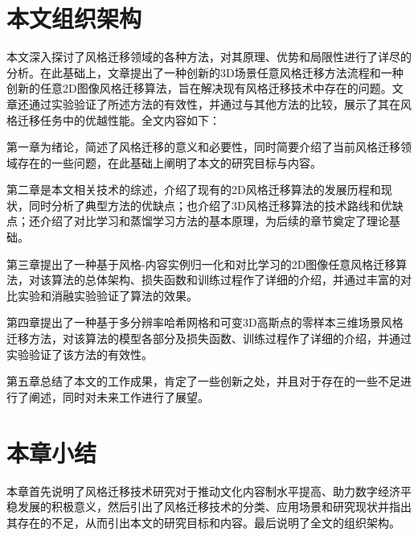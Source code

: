 \section{本文组织架构}
本文深入探讨了风格迁移领域的各种方法，对其原理、优势和局限性进行了详尽的分析。在此基础上，文章提出了一种创新的3D场景任意风格迁移方法流程和一种创新的任意2D图像风格迁移算法，旨在解决现有风格迁移技术中存在的问题。文章还通过实验验证了所述方法的有效性，并通过与其他方法的比较，展示了其在风格迁移任务中的优越性能。全文内容如下：
\par 第一章为绪论，简述了风格迁移的意义和必要性，同时简要介绍了当前风格迁移领域存在的一些问题，在此基础上阐明了本文的研究目标与内容。 
\par 第二章是本文相关技术的综述，介绍了现有的2D风格迁移算法的发展历程和现状，同时分析了典型方法的优缺点；也介绍了3D风格迁移算法的技术路线和优缺点；还介绍了对比学习和蒸馏学习方法的基本原理，为后续的章节奠定了理论基础。
\par 第三章提出了一种基于风格-内容实例归一化和对比学习的2D图像任意风格迁移算法，对该算法的总体架构、损失函数和训练过程作了详细的介绍，并通过丰富的对比实验和消融实验验证了算法的效果。
\par 第四章提出了一种基于多分辨率哈希网格和可变3D高斯点的零样本三维场景风格迁移方法，对该算法的模型各部分及损失函数、训练过程作了详细的介绍，并通过实验验证了该方法的有效性。
\par 第五章总结了本文的工作成果，肯定了一些创新之处，并且对于存在的一些不足进行了阐述，同时对未来工作进行了展望。

\section{本章小结}
本章首先说明了风格迁移技术研究对于推动文化内容制水平提高、助力数字经济平稳发展的积极意义，然后引出了风格迁移技术的分类、应用场景和研究现状并指出其存在的不足，从而引出本文的研究目标和内容。最后说明了全文的组织架构。  

